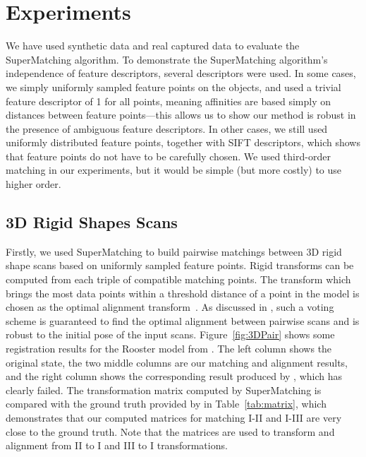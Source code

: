 \section{Experiments}
\label{sec:experiments}

We have used synthetic data and real captured data to evaluate the SuperMatching algorithm.
To demonstrate  the SuperMatching algorithm's independence of feature descriptors, several descriptors were used.
In some cases, we simply uniformly sampled feature points on the objects, and used a trivial feature descriptor of 1 for all points, meaning affinities are based simply on distances between feature points---this allows us to show our method is robust in the presence of ambiguous feature descriptors.
In other cases, we still used uniformly distributed feature points, together with SIFT descriptors, which shows that feature points do not have to be carefully chosen.
We used third-order matching in our experiments, but it would be simple (but more costly) to use higher order.

\subsection{3D Rigid Shapes Scans}
\label{subsec:3DRigid}

Firstly, we used SuperMatching to build pairwise matchings between 3D rigid shape scans based on uniformly sampled feature points.
Rigid transforms can be computed from each triple of compatible matching points.
The transform which brings the most data points within a threshold distance of a point in the model is chosen as the optimal alignment transform~\cite{Huttenlocher90}.
As discussed in \cite{Gelfand05}, such a voting scheme is guaranteed to find the optimal alignment between pairwise scans and is robust to the initial pose of the input scans.
Figure~\ref{fig:3DPair} shows some registration results for the Rooster model from \cite{Chuang09}. The left column shows the original state,
the two middle columns are our matching and alignment results, and
the right column shows the corresponding result produced by \cite{Aiger08}, which has clearly failed.
The transformation matrix computed by  SuperMatching is compared with the ground truth provided by \cite{Chuang09} in Table~\ref{tab:matrix},
which demonstrates that our computed matrices for matching I-II and I-III are very close to the ground truth.
Note that the matrices are used to transform and alignment from II to I and III to I transformations. 

